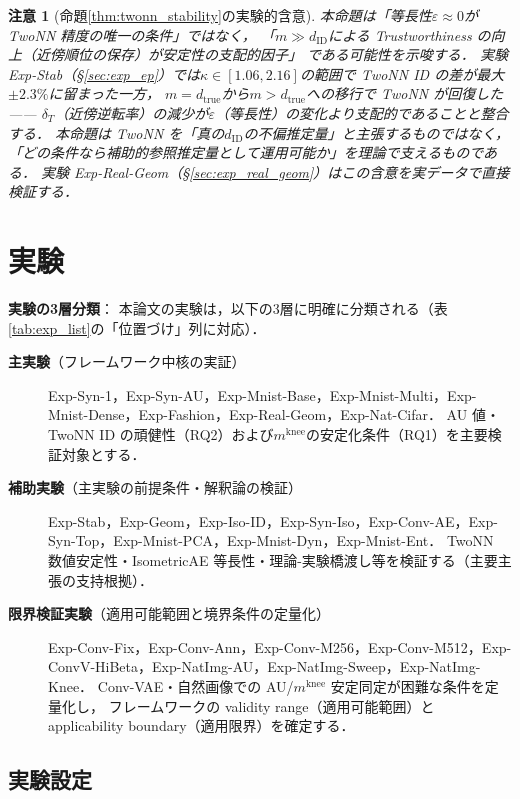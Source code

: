 \documentclass[11pt,a4paper]{jsarticle}
\newtheorem{remark}{注意}
\newcommand{\kap}{\kappa}
\newcommand{\mknee}{m^{\mathrm{knee}}}
\begin{document}
\begin{remark}[命題\ref{thm:twonn_stability}の実験的含意]
本命題は「等長性$\varepsilon \approx 0$が TwoNN 精度の唯一の条件」ではなく，
「$m \gg d_\mathrm{ID}$による Trustworthiness の向上（近傍順位の保存）が安定性の支配的因子」
である可能性を示唆する．
実験 Exp-Stab（§\ref{sec:exp_ep}）では$\kap \in [1.06, 2.16]$の範囲で TwoNN ID の差が最大$\pm 2.3\%$に留まった一方，
$m = d_\mathrm{true}$から$m > d_\mathrm{true}$への移行で TwoNN が回復した——
$\delta_T$（近傍逆転率）の減少が$\varepsilon$（等長性）の変化より支配的であることと整合する．
本命題は TwoNN を「真の$d_\mathrm{ID}$の不偏推定量」と主張するものではなく，
「どの条件なら補助的参照推定量として運用可能か」を理論で支えるものである．
実験 Exp-Real-Geom（§\ref{sec:exp_real_geom}）はこの含意を実データで直接検証する．
\end{remark}

\section{実験}\label{sec:exp}

\textbf{実験の3層分類}：
本論文の実験は，以下の3層に明確に分類される（表\ref{tab:exp_list}の「位置づけ」列に対応）．
\begin{description}
  \item[\textbf{主実験}（フレームワーク中核の実証）]
        Exp-Syn-1，Exp-Syn-AU，Exp-Mnist-Base，Exp-Mnist-Multi，Exp-Mnist-Dense，Exp-Fashion，Exp-Real-Geom，Exp-Nat-Cifar．
        AU 値・TwoNN ID の頑健性（RQ2）および$\mknee$の安定化条件（RQ1）を主要検証対象とする．
  \item[\textbf{補助実験}（主実験の前提条件・解釈論の検証）]
        Exp-Stab，Exp-Geom，Exp-Iso-ID，Exp-Syn-Iso，Exp-Conv-AE，Exp-Syn-Top，Exp-Mnist-PCA，Exp-Mnist-Dyn，Exp-Mnist-Ent．
        TwoNN 数値安定性・IsometricAE 等長性・理論-実験橋渡し等を検証する（主要主張の支持根拠）．
  \item[\textbf{限界検証実験}（適用可能範囲と境界条件の定量化）]
        Exp-Conv-Fix，Exp-Conv-Ann，Exp-Conv-M256，Exp-Conv-M512，Exp-ConvV-HiBeta，Exp-NatImg-AU，Exp-NatImg-Sweep，Exp-NatImg-Knee．
        Conv-VAE・自然画像での AU/$\mknee$ 安定同定が困難な条件を定量化し，
        フレームワークの validity range（適用可能範囲）と applicability boundary（適用限界）を確定する．
\end{description}

\subsection{実験設定}\label{sec:exp_setup}
\end{document}
